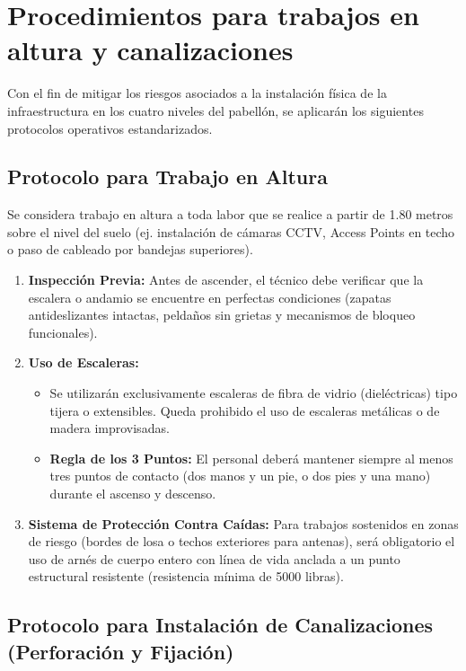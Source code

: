 \section{Procedimientos para trabajos en altura y canalizaciones}

Con el fin de mitigar los riesgos asociados a la instalación física de la infraestructura en los cuatro niveles del pabellón, se aplicarán los siguientes protocolos operativos estandarizados.

\subsection*{Protocolo para Trabajo en Altura}

Se considera trabajo en altura a toda labor que se realice a partir de 1.80 metros sobre el nivel del suelo (ej. instalación de cámaras CCTV, Access Points en techo o paso de cableado por bandejas superiores).

\begin{enumerate}
    \item \textbf{Inspección Previa:} Antes de ascender, el técnico debe verificar que la escalera o andamio se encuentre en perfectas condiciones (zapatas antideslizantes intactas, peldaños sin grietas y mecanismos de bloqueo funcionales).
    \item \textbf{Uso de Escaleras:}
    \begin{itemize}
        \item Se utilizarán exclusivamente escaleras de fibra de vidrio (dieléctricas) tipo tijera o extensibles. Queda prohibido el uso de escaleras metálicas o de madera improvisadas.
        \item \textbf{Regla de los 3 Puntos:} El personal deberá mantener siempre al menos tres puntos de contacto (dos manos y un pie, o dos pies y una mano) durante el ascenso y descenso.
    \end{itemize}
    \item \textbf{Sistema de Protección Contra Caídas:} Para trabajos sostenidos en zonas de riesgo (bordes de losa o techos exteriores para antenas), será obligatorio el uso de arnés de cuerpo entero con línea de vida anclada a un punto estructural resistente (resistencia mínima de 5000 libras).
\end{enumerate}

\subsection*{Protocolo para Instalación de Canalizaciones (Perforación y Fijación)}

